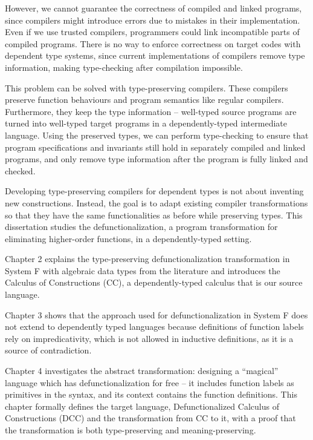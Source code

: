 However, we cannot guarantee the correctness of compiled and linked programs, since compilers might introduce errors due to mistakes in their implementation. Even if we use trusted compilers, programmers could link incompatible parts of compiled programs. There is no way to enforce correctness on target codes with dependent type systems, since current implementations of compilers remove type information, making type-checking after compilation impossible.

This problem can be solved with type-preserving compilers. These compilers preserve function behaviours and program semantics like regular compilers. Furthermore, they keep the type information – well-typed source programs are turned into well-typed target programs in a dependently-typed intermediate language. Using the preserved types, we can perform type-checking to ensure that program specifications and invariants still hold in separately compiled and linked programs, and only remove type information after the program is fully linked and checked.

Developing type-preserving compilers for dependent types is not about inventing new constructions. Instead, the goal is to adapt existing compiler transformations so that they have the same functionalities as before while preserving types. This dissertation studies the defunctionalization, a program transformation for eliminating higher-order functions, in a dependently-typed setting.

Chapter 2 explains the type-preserving defunctionalization transformation in System F with algebraic data types from the literature and introduces the Calculus of Constructions (CC), a dependently-typed calculus that is our source language.

Chapter 3 shows that the approach used for defunctionalization in System F does not extend to dependently typed languages because definitions of function labels rely on impredicativity, which is not allowed in inductive definitions, as it is a source of contradiction.

Chapter 4 investigates the abstract transformation: designing a “magical” language which has defunctionalization for free – it includes function labels as primitives in the syntax, and its context contains the function definitions. This chapter formally defines the target language, Defunctionalized Calculus of Constructions (DCC) and the transformation from CC to it, with a proof that the transformation is both type-preserving and meaning-preserving.

